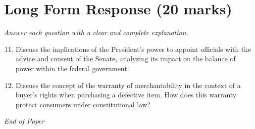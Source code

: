\documentclass[12pt]{article}
\begin{document}
\section*{Long Form Response (20 marks)}
\textit{Answer each question with a clear and complete explanation.}
\begin{enumerate}[label=\arabic*.]
\setcounter{enumi}{10}
\item Discuss the implications of the President's power to appoint officials with the advice and consent of the Senate, analyzing its impact on the balance of power within the federal government.
\item Discuss the concept of the warranty of merchantability in the context of a buyer's rights when purchasing a defective item. How does this warranty protect consumers under constitutional law?
\end{enumerate}

\vfill
\noindent\textit{End of Paper}
\end{document}
